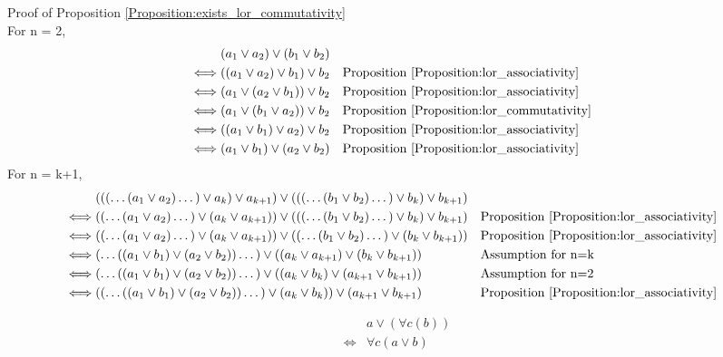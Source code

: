Proof of Proposition \ref{Proposition:exists_lor_commutativity} \\
For n = 2,
\begin{align*}
& (a_1 \lor a_2) \lor (b_1 \lor b_2) \\
\iff & ((a_1 \lor a_2) \lor b_1) \lor b_2
& & \text{Proposition \ref{Proposition:lor_associativity}} \\
\iff & (a_1 \lor (a_2 \lor b_1)) \lor b_2
& & \text{Proposition \ref{Proposition:lor_associativity}} \\
\iff & (a_1 \lor (b_1 \lor a_2)) \lor b_2
& & \text{Proposition \ref{Proposition:lor_commutativity}} \\
\iff & ((a_1 \lor b_1) \lor a_2) \lor b_2
& & \text{Proposition \ref{Proposition:lor_associativity}} \\
\iff & (a_1 \lor b_1) \lor (a_2 \lor b_2)
& & \text{Proposition \ref{Proposition:lor_associativity}} \\
\end{align*}
For n = k+1,
\begin{align*}
& ((( \dots (a_1 \lor a_2) \dots ) \lor a_k) \lor a_{k+1}) \lor ((( \dots (b_1 \lor b_2) \dots ) \lor b_k ) \lor b_{k+1}) \\
\iff & (( \dots (a_1 \lor a_2) \dots ) \lor (a_k \lor a_{k+1})) \lor ((( \dots (b_1 \lor b_2) \dots ) \lor b_k ) \lor b_{k+1})
& & \text{Proposition \ref{Proposition:lor_associativity}} \\
\iff & (( \dots (a_1 \lor a_2) \dots ) \lor (a_k \lor a_{k+1})) \lor (( \dots (b_1 \lor b_2) \dots ) \lor (b_k \lor b_{k+1}))
& & \text{Proposition \ref{Proposition:lor_associativity}} \\
\iff & ( \dots ((a_1 \lor b_1) \lor (a_2 \lor b_2)) \dots ) \lor ((a_k \lor a_{k+1}) \lor (b_k \lor b_{k+1}))
& & \text{Assumption for n=k} \\
\iff & ( \dots ((a_1 \lor b_1) \lor (a_2 \lor b_2)) \dots ) \lor ((a_k \lor b_k) \lor (a_{k+1} \lor b_{k+1}))
& & \text{Assumption for n=2} \\
\iff & (( \dots ((a_1 \lor b_1) \lor (a_2 \lor b_2)) \dots ) \lor (a_k \lor b_k)) \lor (a_{k+1} \lor b_{k+1})
& & \text{Proposition \ref{Proposition:lor_associativity}} \\
\end{align*}

\begin{prop}
\label{Proposition:lor_forall_distributivity}
\begin{align*}
& a \lor (\forall c (b)) \\
\iff & \forall c (a \lor b)
\end{align*}
\end{prop}

